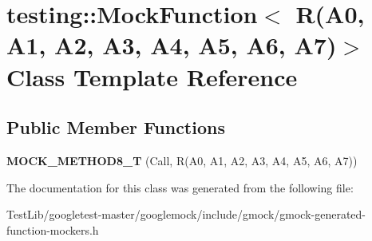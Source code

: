 \hypertarget{classtesting_1_1MockFunction_3_01R_07A0_00_01A1_00_01A2_00_01A3_00_01A4_00_01A5_00_01A6_00_01A7_08_4}{}\section{testing\+:\+:Mock\+Function$<$ R(A0, A1, A2, A3, A4, A5, A6, A7)$>$ Class Template Reference}
\label{classtesting_1_1MockFunction_3_01R_07A0_00_01A1_00_01A2_00_01A3_00_01A4_00_01A5_00_01A6_00_01A7_08_4}
\subsection*{Public Member Functions}
\begin{DoxyCompactItemize}
\item 
\mbox{\label{classtesting_1_1MockFunction_3_01R_07A0_00_01A1_00_01A2_00_01A3_00_01A4_00_01A5_00_01A6_00_01A7_08_4_a895c470e00e07294ab42c09588ae1e4c}} 
{\bfseries M\+O\+C\+K\+\_\+\+M\+E\+T\+H\+O\+D8\+\_\+T} (Call, R(A0, A1, A2, A3, A4, A5, A6, A7))
\end{DoxyCompactItemize}


The documentation for this class was generated from the following file\+:\begin{DoxyCompactItemize}
\item 
Test\+Lib/googletest-\/master/googlemock/include/gmock/gmock-\/generated-\/function-\/mockers.\+h\end{DoxyCompactItemize}
